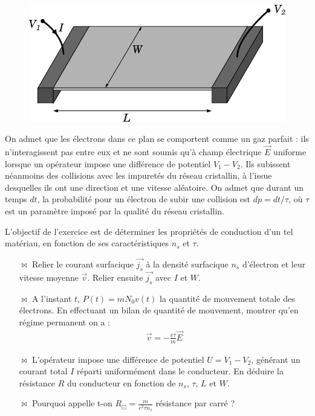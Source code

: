 \documentclass{report}
\begin{document}
\begin{figure}[h!]
\centering
		\includegraphics[scale=0.5]{2DEG_square.pdf}
\end{figure}

On admet que les électrons dans ce plan se comportent comme un gaz parfait : ils n'interagissent pas entre eux et ne sont soumis qu'à champ électrique $\vec{E}$ uniforme lorsque un opérateur impose une différence de potentiel $V_1-V_2$. Ils subissent néanmoins des collisions avec les impuretés du réseau cristallin, à l'issue desquelles ils ont une direction et une vitesse aléatoire. On admet que durant un temps $dt$, la probabilité pour un électron de subir une collision est $dp = dt/\tau$, où $\tau$ est un paramètre imposé par la qualité du réseau cristallin.

L'objectif de l'exercice est de déterminer les propriétés de conduction d'un tel matériau, en fonction de ses caractéristiques $n_s$ et $\tau$.

\begin{itemize}

	\item[$\bowtie$] Relier le courant surfacique $\vec{j_s}$ à la densité surfacique $n_s$ d'électron et leur vitesse moyenne $\vec{v}$. Relier ensuite $\vec{j_s}$ avec $I$ et $W$.

	\item[$\bowtie$] A l'instant $t$, $P(t)=mN_0v(t)$ la quantité de mouvement totale des électrons. En effectuant un bilan de quantité de mouvement, montrer qu'en régime permanent on a :
	\begin{align*}
		\vec{v}=-\frac{e\tau}{m}\vec{E}
	\end{align*}
	
	\item[$\bowtie$] L'opérateur impose une différence de potentiel $U=V_1-V_2$, générant un courant total $I$ réparti uniformément dans le conducteur. En déduire la résistance $R$ du conducteur en fonction de $n_s$, $\tau$, $L$ et $W$.
	
	\item[$\bowtie$] Pourquoi appelle t-on $R_\boxdot=\frac{m}{e^2\tau n_s}$ résistance par carré ?
	
\end{itemize}
\end{document}
